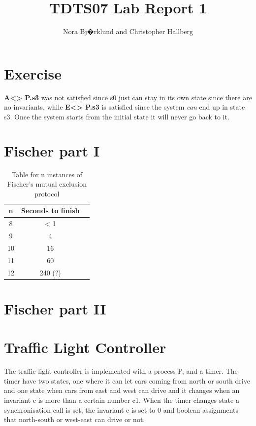 \documentclass[12pt]{article}
\title{TDTS07 Lab Report 1}
\author{Nora Bj�rklund and Christopher Hallberg}
\begin{document}
\maketitle

\section{Exercise}
\textbf{A<> P.s3} was not satisfied since s0 just can stay in its own state since there are no invariants, while \textbf{E<> P.s3} is satisfied since the system \textit{can} end up in state s3. Once the system starts from the initial state it will never go back to it. 
\section{Fischer part I}
\begin{table}[h]
  \centering
  \begin{tabular}{|c|c|c|}
    \hline
    n  & Seconds to finish \\
    \hline
    8  & < 1 \\
    9  & 4 \\
    10 & 16 \\
    11 & 60 \\
    12 & 240 (?) \\
    \hline
  \end{tabular}
  \caption{Table for n instances of Fischer's mutual exclusion protocol }
  \label{tab:n_fischer}
\end{table}
\section{Fischer part II}

\section{Traffic Light Controller}
The traffic light controller is implemented with a process P, and a timer. The timer have two states, one where it can let cars coming from north or south drive and one state when cars from east and west can drive and it changes when an invariant c is more than a certain number c1. When the timer changes state a synchronisation call is set, the invariant c is set to 0 and boolean assignments that north-south or west-east can drive or not.
\end{document}
